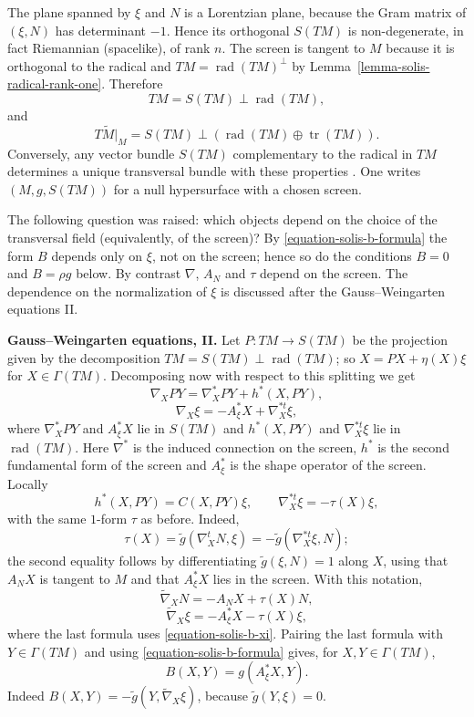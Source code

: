 \begin{remark}
\label{remark-solis-screen-tangent}
The plane spanned by $\xi$ and $N$ is a
Lorentzian plane, because the Gram matrix
of $(\xi,N)$ has determinant $-1$. Hence
its orthogonal $S(TM)$ is non-degenerate,
in fact Riemannian (spacelike), of rank
$n$. The screen is tangent to $M$ because
it is orthogonal to the radical and
$TM=\operatorname{rad}(TM)^{\perp}$ by
Lemma~\ref{lemma-solis-radical-rank-one}.
Therefore
$$
TM=S(TM)\perp\operatorname{rad}(TM),
$$
and
$$
T\widetilde{M}|_M=S(TM)\perp
\left(\operatorname{rad}(TM)\oplus
\operatorname{tr}(TM)\right).
$$
Conversely, any vector bundle $S(TM)$
complementary to the radical in $TM$
determines a unique transversal bundle
with these properties
\cite{duggal1996lightlike}. One writes
$(M,g,S(TM))$ for a null hypersurface
with a chosen screen.
\end{remark}

\noindent
The following question was raised: which
objects depend on the choice of the
transversal field (equivalently, of the
screen)? By \eqref{equation-solis-b-formula}
the form $B$ depends only on $\xi$, not on
the screen; hence so do the conditions
$B=0$ and $B=\rho g$ below. By contrast
$\nabla$, $A_N$ and $\tau$ depend on the
screen. The dependence on the
normalization of $\xi$ is discussed after
the Gauss--Weingarten equations II.

\medskip\noindent
{\bf Gauss--Weingarten equations, II.}
Let $P\colon TM\to S(TM)$ be the
projection given by the decomposition
$TM=S(TM)\perp\operatorname{rad}(TM)$; so
$X=PX+\eta(X)\xi$ for $X\in\Gamma(TM)$.
Decomposing now with respect to this
splitting we get
$$
\nabla_XPY=\nabla^*_XPY+h^*(X,PY),
$$
$$
\nabla_X\xi
=-A^*_{\xi}X+\nabla^{*t}_X\xi,
$$
where $\nabla^*_XPY$ and $A^*_{\xi}X$ lie
in $S(TM)$ and $h^*(X,PY)$ and
$\nabla^{*t}_X\xi$ lie in
$\operatorname{rad}(TM)$. Here $\nabla^*$
is the induced connection on the screen,
$h^*$ is the second fundamental form of
the screen and $A^*_{\xi}$ is the shape
operator of the screen. Locally
$$
h^*(X,PY)=C(X,PY)\xi,\qquad
\nabla^{*t}_X\xi=-\tau(X)\xi,
$$
with the same $1$-form $\tau$ as before.
Indeed,
$$
\tau(X)
=\widetilde{g}(\nabla^t_XN,\xi)
=-\widetilde{g}(\nabla^{*t}_X\xi,N);
$$
the second equality follows by
differentiating $\widetilde{g}(\xi,N)=1$
along $X$, using that $A_NX$ is tangent to
$M$ and that $A^*_{\xi}X$ lies in the
screen. With this notation,
$$
\widetilde{\nabla}_XN
=-A_NX+\tau(X)N,
$$
$$
\widetilde{\nabla}_X\xi
=-A^*_{\xi}X-\tau(X)\xi,
$$
where the last formula uses
\eqref{equation-solis-b-xi}. Pairing the
last formula with $Y\in\Gamma(TM)$ and
using \eqref{equation-solis-b-formula}
gives, for $X,Y\in\Gamma(TM)$,
\begin{equation}
\label{equation-solis-b-ashape}
B(X,Y)=g(A^*_{\xi}X,Y).
\end{equation}
Indeed
$B(X,Y)=-\widetilde{g}(Y,
\widetilde{\nabla}_X\xi)$, because
$\widetilde{g}(Y,\xi)=0$.


